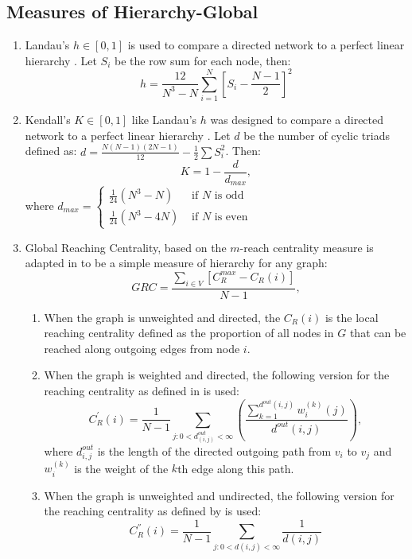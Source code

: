 \documentclass[3p,times]{elsarticle}
\begin{document}
\subsection{Measures of Hierarchy-Global}
\begin{enumerate}
	\item Landau's $h\in[0,1]$ is used to compare a directed network to a perfect linear hierarchy \cite{landau}. Let $S_i$ be the row sum for each node, then:
		$$
		h=\frac{12}{N^3-N}\sum_{i=1}^{N}{[S_i-\frac{N-1}{2}]^{2}}
		$$
	\item Kendall's $K\in[0,1]$ like Landau's $h$ was designed to compare a directed network to a perfect linear hierarchy \cite{kendall}. Let $d$ be the number of cyclic triads
		defined as: $d=\frac{N(N-1)(2N-1)}{12}-\frac{1}{2}\sum{S_i^2}$. Then: 
		$$
		K=1-\frac{d}{d_{max}},
		$$ 
		where $d_{max} = \left\{ \begin{array}{rl}
		\frac{1}{24}(N^3-N)&\mbox{ if $N$ is odd} \\
		\frac{1}{24}(N^3-4N)&\mbox{ if $N$ is even}
		\end{array} \right.$
	\item Global Reaching Centrality, based on the $m$-reach centrality measure is adapted in \cite{GRC} to be a simple measure of hierarchy for any graph:
		$$
		GRC=\frac{\sum_{i\in V}{[C_R^{max}-C_R(i)]}}{N-1},
		$$
		\begin{enumerate}
			\item When the graph is unweighted and directed, the $C_R(i)$ is the local reaching centrality defined as the proportion of all nodes in $G$ that can be reached along 
				outgoing edges from node $i$.
			\item When the graph is weighted and directed, the following version for the reaching centrality as defined in \cite{GRC} is used:
				$$
				C_{R}^{'}(i)=\frac{1}{N-1}\sum_{j: 0<d^{out}_{(i,j)}<\infty}{( \frac{\sum_{k=1}^{d^{out}(i,j)} {w_{i}^{(k)} (j) } }{d^{out}(i,j)} )},
				$$
				where $d^{out}_{i,j}$ is the length of the directed outgoing path from $v_{i}$ to $v_{j}$ and $w^{(k)}_{i}$ is the weight of the $k$th edge along this path. 
			\item When the graph is unweighted and undirected, the following version for the reaching centrality as defined by \cite{GRC} is used:
				$$
				C_{R}^{''}(i)=\frac{1}{N-1}\sum_{j:0<d(i,j)<\infty}{\frac{1}{d(i,j)}}
				$$
		\end{enumerate}
	

\end{enumerate}
\end{document}
